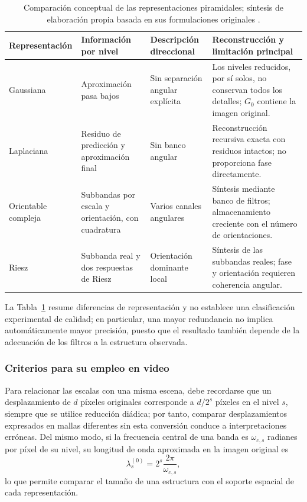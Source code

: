 \begin{table}[htbp]
\centering
\small
\caption[Comparación de representaciones piramidales]{Comparación conceptual de las representaciones piramidales; síntesis de elaboración propia basada en sus formulaciones originales \cite{burt1983laplacian,simoncelli1995steerable,unser2009monogenic,wadhwa2014riesz}.}
\label{tab:piramides_comparacion}
\renewcommand{\arraystretch}{1.25}
\begin{tabularx}{\linewidth}{@{}p{2.3cm}XXX@{}}
\toprule
Representación & Información por nivel & Descripción direccional & Reconstrucción y limitación principal \\
\midrule
Gaussiana & Aproximación pasa bajos & Sin separación angular explícita & Los niveles reducidos, por sí solos, no conservan todos los detalles; $G_0$ contiene la imagen original. \\
Laplaciana & Residuo de predicción y aproximación final & Sin banco angular & Reconstrucción recursiva exacta con residuos intactos; no proporciona fase directamente. \\
Orientable compleja & Subbandas por escala y orientación, con cuadratura & Varios canales angulares & Síntesis mediante banco de filtros; almacenamiento creciente con el número de orientaciones. \\
Riesz & Subbanda real y dos respuestas de Riesz & Orientación dominante local & Síntesis de las subbandas reales; fase y orientación requieren coherencia angular. \\
\bottomrule
\end{tabularx}
\end{table}

La Tabla~\ref{tab:piramides_comparacion} resume diferencias de representación y no establece una clasificación experimental de calidad; en particular, una mayor redundancia no implica automáticamente mayor precisión, puesto que el resultado también depende de la adecuación de los filtros a la estructura observada.

\subsubsection{Criterios para su empleo en video}

Para relacionar las escalas con una misma escena, debe recordarse que un desplazamiento de $d$ píxeles originales corresponde a $d/2^s$ píxeles en el nivel $s$, siempre que se utilice reducción diádica; por tanto, comparar desplazamientos expresados en mallas diferentes sin esta conversión conduce a interpretaciones erróneas. Del mismo modo, si la frecuencia central de una banda es $\omega_{c,s}$ radianes por píxel de su nivel, su longitud de onda aproximada en la imagen original es
\begin{equation}
 \lambda_s^{(0)}=2^s\frac{2\pi}{\omega_{c,s}},
 \label{eq:piramides_longitud_onda_original}
\end{equation}
lo que permite comparar el tamaño de una estructura con el soporte espacial de cada representación.

